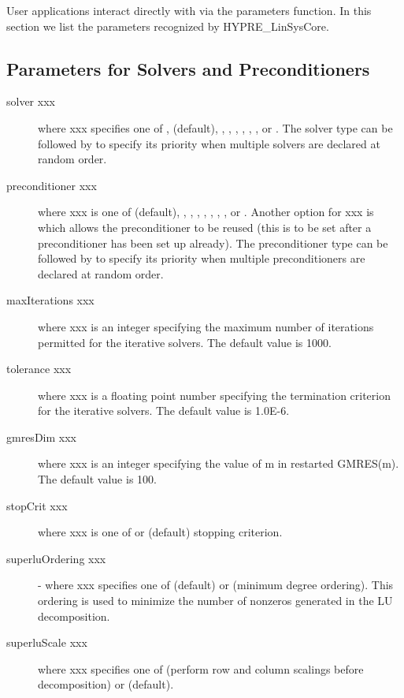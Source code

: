User applications interact directly with \hypre{} via the {\sf parameters}
function. In this section we list the parameters recognized by
{\sf HYPRE\_LinSysCore}.
                                                                                
\subsection{Parameters for Solvers and Preconditioners}
                                                                                
\begin{description}
\item[solver xxx] where xxx specifies one of , 
      (default), , , ,
     , , , or . 
     The solver type can be followed by  to specify its 
     priority when multiple solvers are declared at random order.
\item[preconditioner xxx] where xxx is one of  (default), 
     , , , ,
     , , , or .  Another
     option for xxx is  which allows the preconditioner to be
     reused (this is to be set after a preconditioner has been set up already).
     The preconditioner type can be followed by  to specify
     its priority when multiple preconditioners are declared at random order.
\item[maxIterations xxx] where xxx is an integer specifying the maximum
     number of iterations permitted for the iterative solvers.  The default
     value is 1000.
\item[tolerance xxx] where xxx is a floating point number specifying the
     termination criterion for the iterative solvers.  The default
     value is 1.0E-6.
\item[gmresDim xxx] where xxx is an integer specifying the value of m in
     restarted GMRES(m).  The default value is 100.
\item[stopCrit xxx] where xxx is one of  or 
      (default) stopping criterion.
\item[superluOrdering xxx] - where xxx specifies one of 
     (default) or  (minimum degree ordering).  This ordering
     is used to minimize the number of nonzeros generated in the LU
     decomposition.
\item[superluScale xxx] where xxx specifies one of  (perform row
     and column scalings before decomposition) or  (default).
\end{description}
                                                                                
